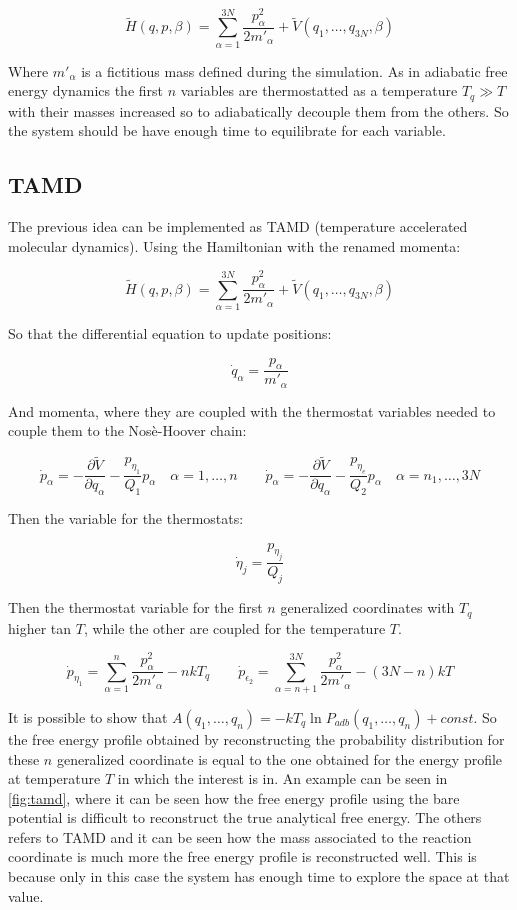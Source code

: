 $$\tilde{H}(q, p, \beta) = \sum\limits_{\alpha=1}^{3N}\frac{p_\alpha^2}{2m'_\alpha}+ \tilde{V}(q_1, \dots, q_{3N}, \beta)$$

Where $m'_\alpha$ is a fictitious mass defined during the simulation.
As in adiabatic free energy dynamics the first $n$ variables are thermostatted as a temperature $T_q\gg T$ with their masses increased so to adiabatically decouple them from the others.
So the system should be have enough time to equilibrate for each variable.

	\subsection{TAMD}
	The previous idea can be implemented as TAMD (temperature accelerated molecular dynamics).
	Using the Hamiltonian with the renamed momenta:

	$$\tilde{H}(q, p, \beta) = \sum\limits_{\alpha=1}^{3N}\frac{p_\alpha^2}{2m'_\alpha} + \tilde{V}(q_1, \dots, q_{3N}, \beta)$$

	So that the differential equation to update positions:

	$$\dot{q}_\alpha = \frac{p_\alpha}{m'_\alpha}$$

	And momenta, where they are coupled with the thermostat variables needed to couple them to the Nos\`e-Hoover chain:

	$$\dot{p}_\alpha = -\frac{\partial\tilde{V}}{\partial q_\alpha} - \frac{p_{\eta_1}}{Q_1}p_\alpha\quad \alpha= 1, \dots, n\qquad\dot{p}_\alpha = -\frac{\partial\tilde{V}}{\partial q_\alpha}-\frac{p_{\eta_e}}{Q_2}p_\alpha\quad \alpha = n_1, \dots, 3N$$

	Then the variable for the thermostats:

	$$\dot{\eta}_j = \frac{p_{\eta_j}}{Q_j}$$

	Then the thermostat variable for the first $n$ generalized coordinates with $T_q$ higher tan $T$, while the other are coupled for the temperature $T$.

	$$\dot{p}_{\eta_1} = \sum\limits_{\alpha=1}^n\frac{p_\alpha^2}{2m'_\alpha}-nkT_q\qquad \dot{p}_{\epsilon_2} = \sum\limits_{\alpha=n+1}^{3N}\frac{p_\alpha^2}{2m'_\alpha}-(3N-n)kT$$

	It is possible to show that $A(q_1, \dots, q_n) = -kT_q\ln P_{adb}(q_1, \dots, q_n) + const$.
	So the free energy profile obtained by reconstructing the probability distribution for these $n$ generalized coordinate is equal to the one obtained for the energy profile at temperature $T$ in which the interest is in.
	An example can be seen in \ref{fig:tamd}, where it can be seen how the free energy profile using the bare potential is difficult to reconstruct the true analytical free energy.
	The others refers to TAMD and it can be seen how the mass associated to the reaction coordinate is much more the free energy profile is reconstructed well.
	This is because only in this case the system has enough time to explore the space at that value.

